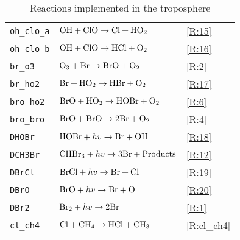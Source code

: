 \begin{table}[ht]
{\begin{tabular}{|l|l|l|}
\texttt{oh\_clo\_a}              & $\mathrm{OH} + \mathrm{ClO} \rightarrow \mathrm{Cl} + \mathrm{HO_2}$                              & \ref{R:15} \\
\texttt{oh\_clo\_b}              & $\mathrm{OH} + \mathrm{ClO} \rightarrow \mathrm{HCl} + \mathrm{O_2}$                              & \ref{R:16} \\
\texttt{br\_o3}                  & $\mathrm{O_3} + \mathrm{Br} \rightarrow \mathrm{BrO} + \mathrm{O_2}$                              & \ref{R:2} \\
\texttt{br\_ho2}                 & $\mathrm{Br} + \mathrm{HO_2} \rightarrow \mathrm{HBr} + \mathrm{O_2}$                             & \ref{R:17} \\
\texttt{bro\_ho2}                & $\mathrm{BrO} + \mathrm{HO_2} \rightarrow \mathrm{HOBr} + \mathrm{O_2}$                                    & \ref{R:6} \\
\texttt{bro\_bro}                & $\mathrm{BrO} + \mathrm{BrO} \rightarrow 2\mathrm{Br} + \mathrm{O_2}$                             & \ref{R:4} \\
\texttt{DHOBr}                   & $\mathrm{HOBr} + hv \rightarrow \mathrm{Br} + \mathrm{OH}$                                      & \ref{R:18} \\
\texttt{DCH3Br}                  & $\mathrm{CHBr_3} + hv \rightarrow 3\mathrm{Br} + \mathrm{Products}$                             & \ref{R:12} \\
\texttt{DBrCl}                   & $\mathrm{BrCl} + hv \rightarrow \mathrm{Br} + \mathrm{Cl}$                                      & \ref{R:19} \\
\texttt{DBrO}                    & $\mathrm{BrO} + hv \rightarrow \mathrm{Br} + \mathrm{O}$                                        & \ref{R:20} \\
\texttt{DBr2}                    & $\mathrm{Br_2} + hv \rightarrow 2\mathrm{Br} $                                                & \ref{R:1} \\
\texttt{cl\_ch4}                    & $\mathrm{Cl} + \mathrm{CH_4} \rightarrow \mathrm{HCl} + \mathrm{CH_3} $                                                & \ref{R:cl_ch4} \\
\hline
\end{tabular}
}
\caption{Reactions implemented in the troposphere}
\label{tab:3}
\end{table}